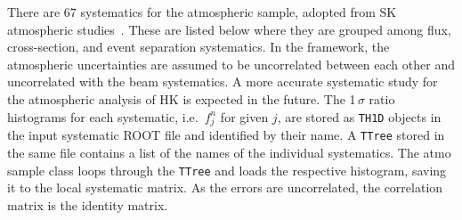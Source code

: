 \documentclass[a4paper, 11pt]{article}
\begin{document}
There are 67 systematics for the atmospheric sample, adopted from SK atmospheric studies~\cite{Abe:2017aap}.
These are listed below where they are grouped among flux, cross-section, and %
event separation systematics.
In the framework, the atmospheric uncertainties are assumed to be uncorrelated between each other and uncorrelated with the beam systematics.
A more accurate systematic study for the atmospheric analysis of HK is expected in the future.
The 1\,$\sigma$ ratio histograms for each systematic, i.e.\ $f^n_j$ for given $j$, are stored as \texttt{TH1D} %
objects in the input systematic ROOT file and identified by their name.
A \texttt{TTree} stored in the same file contains a list of the names of the individual systematics.
The atmo sample class loops through the \texttt{TTree} and loads the respective histogram, saving it to the %
local systematic matrix.
As the errors are uncorrelated, the correlation matrix is the identity matrix.
\end{document}
